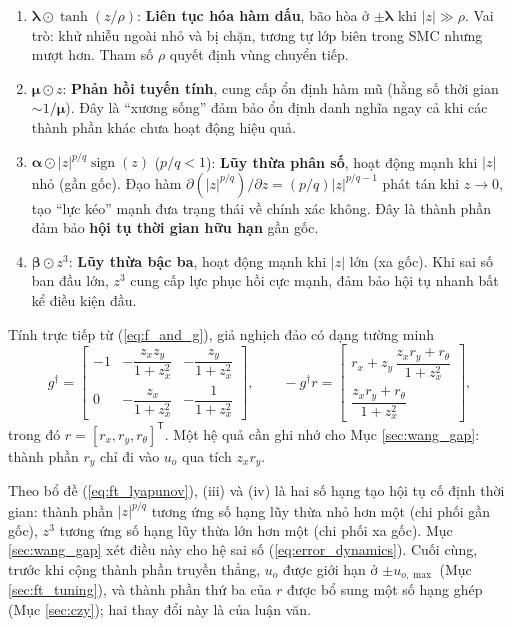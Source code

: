 \documentclass[12pt,a4paper]{article}
\newcommand{\T}{\mathsf{T}}
\DeclareMathOperator{\sign}{sign}
\begin{document}
\begin{enumerate}
    \item $\bm{\lambda} \odot \tanh(z/\rho)$: \textbf{Liên tục hóa hàm dấu}, bão hòa ở $\pm\bm{\lambda}$ khi $|z| \gg \rho$. Vai trò: khử nhiễu ngoài nhỏ và bị chặn, tương tự lớp biên trong SMC nhưng mượt hơn. Tham số $\rho$ quyết định vùng chuyển tiếp.

    \item $\bm{\mu} \odot z$: \textbf{Phản hồi tuyến tính}, cung cấp ổn định hàm mũ (hằng số thời gian $\sim 1/\bm{\mu}$). Đây là ``xương sống'' đảm bảo ổn định danh nghĩa ngay cả khi các thành phần khác chưa hoạt động hiệu quả.

    \item $\bm{\alpha} \odot |z|^{p/q} \sign(z)$ ($p/q < 1$): \textbf{Lũy thừa phân số}, hoạt động mạnh khi $|z|$ nhỏ (gần gốc). Đạo hàm $\partial(|z|^{p/q})/\partial z = (p/q)|z|^{p/q - 1}$ phát tán khi $z \to 0$, tạo ``lực kéo'' mạnh đưa trạng thái về chính xác không. Đây là thành phần đảm bảo \textbf{hội tụ thời gian hữu hạn} gần gốc.

    \item $\bm{\beta} \odot z^3$: \textbf{Lũy thừa bậc ba}, hoạt động mạnh khi $|z|$ lớn (xa gốc). Khi sai số ban đầu lớn, $z^3$ cung cấp lực phục hồi cực mạnh, đảm bảo hội tụ nhanh bất kể điều kiện đầu.
\end{enumerate}

Tính trực tiếp từ (\ref{eq:f_and_g}), giả nghịch đảo có dạng tường minh
\begin{equation}\label{eq:gpinv}
    g^\dagger = \begin{bmatrix}
        -1 & -\dfrac{z_x z_y}{1+z_x^2} & -\dfrac{z_y}{1+z_x^2} \\[8pt]
        0 & -\dfrac{z_x}{1+z_x^2} & -\dfrac{1}{1+z_x^2}
    \end{bmatrix},
    \qquad
    -g^\dagger r = \begin{bmatrix} r_x + z_y\,\dfrac{z_x r_y + r_\theta}{1+z_x^2} \\[8pt] \dfrac{z_x r_y + r_\theta}{1+z_x^2} \end{bmatrix},
\end{equation}
trong đó $r = [r_x, r_y, r_\theta]^\T$. Một hệ quả cần ghi nhớ cho Mục \ref{sec:wang_gap}: thành phần $r_y$ chỉ đi vào $u_o$ qua tích $z_x r_y$.

Theo bổ đề (\ref{eq:ft_lyapunov}), (iii) và (iv) là hai số hạng tạo hội tụ cố định thời gian: thành phần $|z|^{p/q}$ tương ứng số hạng lũy thừa nhỏ hơn một (chi phối gần gốc), $z^3$ tương ứng số hạng lũy thừa lớn hơn một (chi phối xa gốc). Mục \ref{sec:wang_gap} xét điều này cho hệ sai số (\ref{eq:error_dynamics}). Cuối cùng, trước khi cộng thành phần truyền thẳng, $u_o$ được giới hạn ở $\pm u_{o,\max}$ (Mục \ref{sec:ft_tuning}), và thành phần thứ ba của $r$ được bổ sung một số hạng ghép (Mục \ref{sec:czy}); hai thay đổi này là của luận văn.
\end{document}
